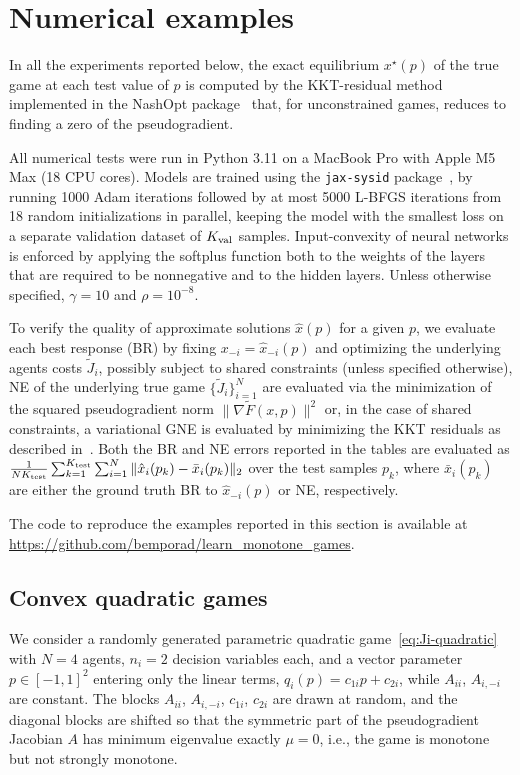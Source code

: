 \documentclass[11pt, a4paper]{article}
\theoremstyle{remark}
\theoremstyle{plain}
\begin{document}
\section{Numerical examples}
\label{sec:numerical-examples}
In all the experiments reported below, the exact equilibrium $x^\star(p)$ of the true game at each test value of $p$ is computed by the KKT-residual method implemented in the NashOpt package~\cite{Bem25} that,
for unconstrained games, reduces to finding a zero of the pseudogradient.

All numerical tests were run in Python 3.11
on a MacBook Pro with Apple M5 Max (18 CPU cores). Models are trained using the \texttt{jax-sysid} package~\cite{Bem25b}, by running 1000 Adam iterations followed by at most 5000 L-BFGS iterations from 18 random initializations in parallel, keeping the model with the smallest loss on a separate validation dataset of $K_{\rm val}$ samples.
Input-convexity of neural networks is enforced by applying the softplus function both to the weights of the layers that are required to be nonnegative and to the hidden layers. Unless otherwise specified, $\gamma=10$ and $\rho=10^{-8}$. 

To verify the quality of approximate solutions $\hat x(p)$ for a given $p$, we
evaluate each best response (BR) by fixing $x_{-i}=\hat x_{-i}(p)$ and optimizing
the underlying agents costs $\tilde J_i$, possibly subject to shared constraints (unless specified otherwise), NE of the underlying true game $\{\tilde J_i\}_{i=1}^N$ are evaluated via the minimization of the squared pseudogradient norm $\|\nabla \tilde F(x,p)\|^2$ or, in the case of shared constraints, a variational GNE is evaluated by minimizing the KKT residuals as described in~\cite{Bem25}. 
Both the BR and NE errors reported in the tables are evaluated as $\frac{1}{NK_{\rm test}}\sum_{k=1}^{K_{\rm test}}\sum_{i=1}^{N}\|\hat x_i(p_k) - \bar x_i(p_k)\|_2$ over the test samples $p_k$, where $\bar x_i(p_k)$ are either the ground truth BR to $\hat x_{-i}(p)$ or NE, respectively. 

The code to reproduce the examples reported in this section is available at \url{https://github.com/bemporad/learn_monotone_games}.

\subsection{Convex quadratic games}
We consider a randomly generated parametric quadratic game~\eqref{eq:Ji-quadratic} with $N=4$ agents, $n_i=2$ decision variables each, and a vector parameter $p\in[-1,1]^2$ entering only the linear terms, $q_i(p)=c_{1i}p+c_{2i}$, while $A_{ii}$, $A_{i,-i}$ are constant. The blocks $A_{ii}$, $A_{i,-i}$, $c_{1i}$, $c_{2i}$ are drawn at random, and the diagonal blocks are shifted so that the symmetric part of the pseudogradient Jacobian $A$ has minimum eigenvalue exactly $\mu=0$, i.e., the game is monotone but not strongly monotone.
\end{document}
